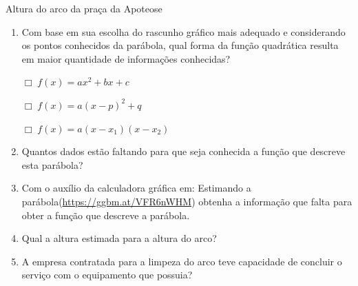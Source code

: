\begin{task}{Altura do arco da praça da Apoteose}
\begin{enumerate}
\item {} 
Com base em sua escolha do rascunho gráfico mais adequado e considerando os pontos conhecidos da parábola, qual forma da função quadrática resulta em maior quantidade de informações conhecidas?

\(\Box \; f(x)=ax^2+bx+c\)

\(\Box \; f(x)=a(x-p)^2+q\)

\(\Box \; f(x)=a(x-x_1)(x-x_2)\)

\item {} 
Quantos dados estão faltando para que seja conhecida a função que descreve esta parábola?

\item {} 
Com o auxílio da calculadora gráfica em: Estimando a parábola(\url{https://ggbm.at/VFR6nWHM}) obtenha a informação que falta para obter a função que descreve a parábola.

\item {} 
Qual a altura estimada para a altura do arco?

\item {} 
A empresa contratada para a limpeza do arco teve capacidade de concluir o serviço com o equipamento que possuia?

\end{enumerate}
\end{task}


